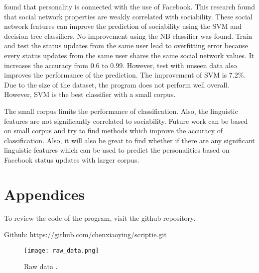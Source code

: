 \documentclass[
10pt, %
a4paper, %
oneside, %
headinclude,footinclude, %
] {book}%
\begin{document}
\citet{amichai2010social} found that personality is connected with the use of Facebook. This research found that social network properties are weakly correlated with sociability. These social network features can improve the prediction of sociability using the SVM and decision tree classifiers. No improvement using the NB classifier was found. Train and test the status updates from the same user lead to overfitting error because every status updates from the same user shares the same social network values. It increases the accuracy from 0.6 to 0.99. However, test with unseen data also improves the performance of the prediction. The improvement of SVM is 7.2\%. Due to the size of the dataset, the program does not perform well overall. However, SVM is the best classifier with a small corpus. 

The small corpus limits the performance of classification. Also, the linguistic features are not significantly correlated to sociability. Future work can be based on small corpus and try to find methods which improve the accuracy of classification. Also, it will also be great to find whether if there are any significant linguistic features which can be used to predict the personalities based on Facebook status updates with larger corpus. 



\cleardoublepage
{}
 



\appendix
\chapter{Appendices}

To review the code of the program, visit the github repository.

Github: https://github.com/chenxiaoying/scriptie.git

\begin{figure}[!htb]
    \centering 
    \caption{Raw data .\label{fig:data}}
    \texttt{[image: raw\_data.png]}
\end{figure}
\end{document}
